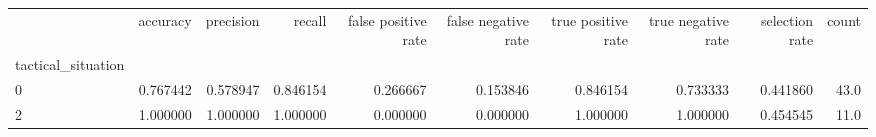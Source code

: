 \begin{tabular}{lrrrrrrrrr}
\toprule
{} &  accuracy &  precision &    recall &  false positive rate &  false negative rate &  true positive rate &  true negative rate &  selection rate &  count \\
tactical\_situation &           &            &           &                      &                      &                     &                     &                 &        \\
\midrule
0                  &  0.767442 &   0.578947 &  0.846154 &             0.266667 &             0.153846 &            0.846154 &            0.733333 &        0.441860 &   43.0 \\
2                  &  1.000000 &   1.000000 &  1.000000 &             0.000000 &             0.000000 &            1.000000 &            1.000000 &        0.454545 &   11.0 \\
\bottomrule
\end{tabular}
